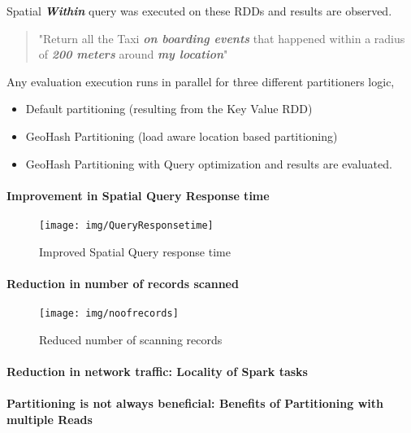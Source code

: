 \documentclass[article,type=msc,colorback,12pt,accentcolor=tud1d]{tudthesis}
\begin{document}
		  Spatial \textbf{\textit{Within}} query was executed on these RDDs and results are observed. 
		  
		  \begin{quote}
		  	"Return all the Taxi \textbf{\textit{on boarding events}} that happened within a radius of \textbf{\textit{200 meters}} around \textbf{\textit{my location}}"
		  \end{quote}
		  
		  Any evaluation execution runs in parallel for three different partitioners logic,
		  \begin{itemize}
		  	\item Default partitioning (resulting from the Key Value RDD)
		  \item GeoHash Partitioning (load aware location based partitioning)
		  \item GeoHash Partitioning with Query optimization
		  and results are evaluated. 
		  \end{itemize}
		  
		  \clearpage
			  \paragraph{Improvement in Spatial Query Response time}
		  	  
				\begin{figure}[h]
				\centering
				\texttt{[image: img/QueryResponsetime]}
				\caption{Improved Spatial Query response time}
				\label{fig:queryresponsetime}
				\end{figure}
				
				
		  \clearpage
			\paragraph{Reduction in number of records scanned}
			
\begin{figure}[h]
\centering
\texttt{[image: img/noofrecords]}
\caption{Reduced number of scanning records}
\label{fig:noofrecords}
\end{figure}
			
			
			\clearpage
			\paragraph{Reduction in network traffic: Locality of Spark tasks}
			\clearpage
			\paragraph{Partitioning is not always beneficial: Benefits of Partitioning with multiple Reads}
			
\end{document}

